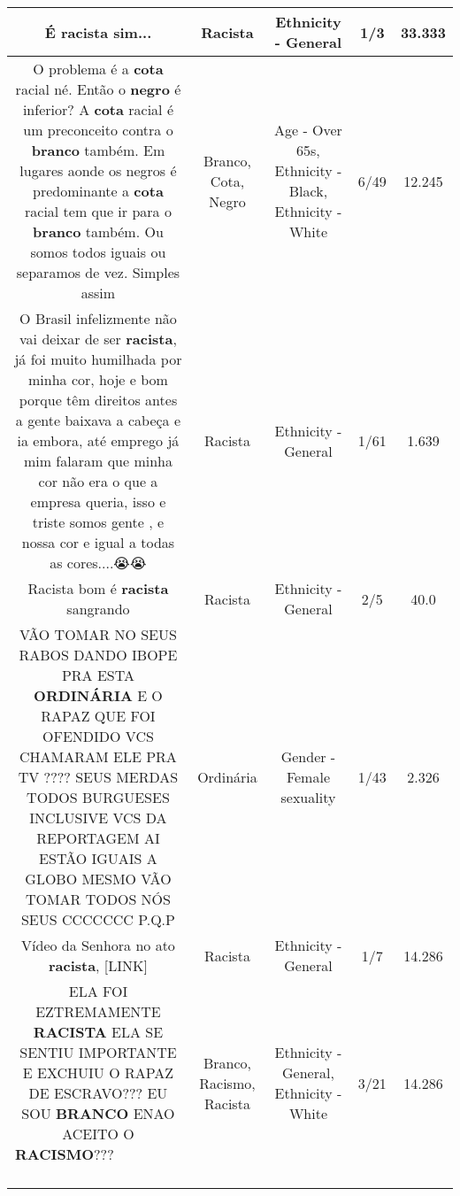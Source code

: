 \documentclass[11pt]{article}
\newlength\mylength
\begin{document}
\begin{center}
\begin{longtable}{|C{.65\mylength}|C{.30\mylength}|C{.12\mylength}|C{.12\mylength}|C{.12\mylength}|}
  \small É \textbf{racista} sim...\normalsize   & Racista & Ethnicity - General & 1/3 & 33.333 \\  \hline
  \small O problema é a \textbf{cota} racial né. Então o \textbf{negro} é inferior? A \textbf{cota} racial é um preconceito contra o \textbf{branco} também. Em lugares aonde os negros é predominante a \textbf{cota} racial tem que ir para o \textbf{branco} também. Ou somos todos iguais ou separamos de vez.  Simples assim\normalsize   & Branco, Cota, Negro & Age - Over 65s, Ethnicity - Black, Ethnicity - White & 6/49 & 12.245 \\  \hline
  \small O Brasil infelizmente não vai deixar de ser \textbf{racista}, já foi muito humilhada por minha cor, hoje e bom porque têm direitos antes a gente baixava a cabeça e ia embora, até emprego já mim falaram que minha cor não era o que a empresa queria, isso e triste somos gente , e nossa cor e igual a todas as cores....😭😭\normalsize   & Racista & Ethnicity - General & 1/61 & 1.639 \\  \hline
  \small Racista bom é \textbf{racista} sangrando\normalsize   & Racista & Ethnicity - General & 2/5 & 40.0 \\  \hline
  \small VÃO TOMAR NO SEUS RABOS DANDO IBOPE PRA ESTA \textbf{ORDINÁRIA} E O RAPAZ QUE FOI OFENDIDO VCS CHAMARAM ELE PRA TV ???? SEUS MERDAS TODOS BURGUESES INCLUSIVE VCS DA REPORTAGEM AI ESTÃO IGUAIS A GLOBO MESMO VÃO TOMAR TODOS NÓS SEUS CCCCCCC P.Q.P\normalsize   & Ordinária & Gender - Female sexuality & 1/43 & 2.326 \\  \hline
  \small Vídeo da Senhora no ato \textbf{racista},  [LINK] \normalsize   & Racista & Ethnicity - General & 1/7 & 14.286 \\  \hline
  \small ELA FOI EZTREMAMENTE \textbf{RACISTA} ELA SE SENTIU IMPORTANTE E EXCHUIU O RAPAZ DE ESCRAVO??? EU SOU \textbf{BRANCO} ENAO ACEITO O \textbf{RACISMO}???👹👺👹👺👹👹😭😭😭😭😭😭😭😭😭😭😭😌😭\normalsize   & Branco, Racismo, Racista & Ethnicity - General, Ethnicity - White & 3/21 & 14.286 \\  \hline

\end{longtable}
\end{center}
\end{document}
